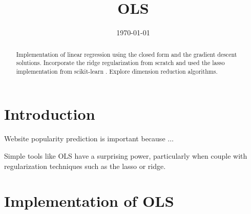 \documentclass[conference]{IEEEtran}
\date{\today}
\begin{document}
%
\title{OLS}


\author{
\and
{}
\and
{}
}



\maketitle

\begin{abstract}
  Implementation of linear regression using the closed form and the
  gradient descent solutions. Incorporate the ridge regularization from scratch
  and used the lasso implementation from scikit-learn \cite{scikit-learn}.
  Explore dimension reduction algorithms.
\end{abstract}





\IEEEpeerreviewmaketitle



\section{Introduction}

Website popularity prediction is important because $\ldots$

Simple tools like OLS have a surprising power, particularly when couple with
regularization techniques such as the lasso or ridge.

\section{Implementation of OLS}
\end{document}
